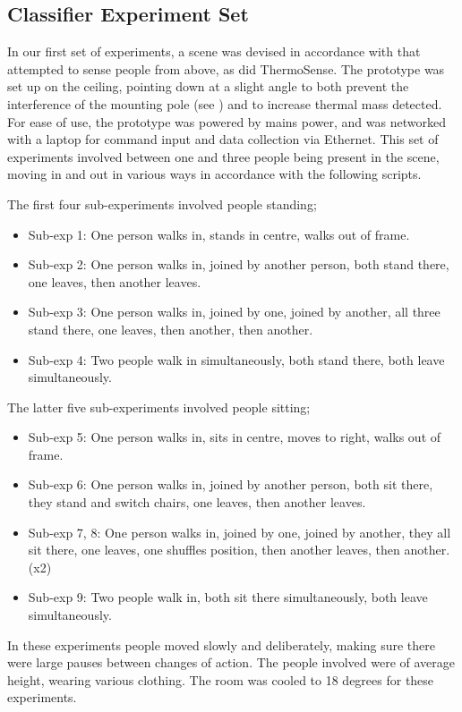 \documentclass[../thesis/thesis.tex]{subfiles}
\begin{document}
\subsection{Classifier Experiment Set}
In our first set of experiments, a scene was devised in accordance with  that attempted to sense people from above, as did ThermoSense. The prototype was set up on the ceiling, pointing down at a slight angle to both prevent the interference of the mounting pole (see ) and to increase thermal mass detected. For ease of use, the prototype was powered by mains power, and was networked with a laptop for command input and data collection via Ethernet. This set of experiments involved between one and three people being present in the scene, moving in and out in various ways in accordance with the following scripts.

The first four sub-experiments involved people standing;
\begin{itemize}
\item Sub-exp 1: One person walks in, stands in centre, walks out of frame.
\item Sub-exp 2: One person walks in, joined by another person, both stand there, one leaves, then another leaves.
\item Sub-exp 3: One person walks in, joined by one, joined by another, all three stand there, one leaves, then another, then another.
\item Sub-exp 4: Two people walk in simultaneously, both stand there, both leave simultaneously.
\end{itemize}

The latter five sub-experiments involved people sitting;
\begin{itemize}
\item Sub-exp 5: One person walks in, sits in centre, moves to right, walks out of frame.
\item Sub-exp 6: One person walks in, joined by another person, both sit there, they stand and switch chairs, one leaves, then another leaves.
\item Sub-exp 7, 8: One person walks in, joined by one, joined by another, they all sit there, one leaves, one shuffles position, then another leaves, then another. (x2)
\item Sub-exp 9: Two people walk in, both sit there simultaneously, both leave simultaneously.
\end{itemize}

In these experiments people moved slowly and deliberately, making sure there were large pauses between changes of action. The people involved were of average height, wearing various clothing. The room was cooled to 18 degrees for these experiments.
\end{document}
